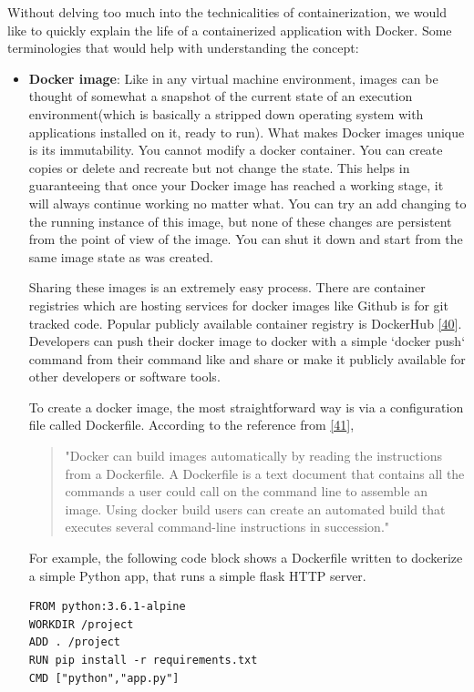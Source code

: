 \documentclass[12pt,titlepage]{article}
\begin{document}
Without delving too much into the technicalities of containerization, we would
like to quickly explain the life of a containerized application with Docker.
Some terminologies that would help with understanding the concept:
\begin{itemize}
\item \textbf{Docker image}: Like in any virtual machine environment, images can be thought of somewhat a
snapshot of the current state of an execution environment(which is basically a
stripped down operating system with applications installed on it, ready to run).
What makes Docker images unique is its immutability. You cannot modify a docker
container. You can create copies or delete and recreate but not change the
state. This helps in guaranteeing that once your Docker image has reached a
working stage, it will always continue working no matter what. You can try an
add changing to the running instance of this image, but none of these changes
are persistent from the point of view of the image. You can shut it down and
start from the same image state as was created.

Sharing these images is an extremely easy process. There are container
registries which are hosting services for docker images like Github is for git
tracked code. Popular publicly available container registry is DockerHub \hyperref[ref:40]{[40}].
Developers can push their docker image to docker with a simple
`docker push` command from their command like and share or make it publicly
available for other developers or software tools.

To create a docker image, the most straightforward way is via a configuration
file called Dockerfile. According to the reference from \hyperref[ref:41]{[41}],

\begin{quote}


"Docker can build images automatically by reading the instructions from a
Dockerfile. A Dockerfile is a text document that contains all the commands a
user could call on the command line to assemble an image. Using docker build
users can create an automated build that executes several command-line
instructions in succession."
\end{quote}

For example, the following code block shows a Dockerfile written to dockerize a
simple Python app, that runs a simple flask HTTP server.

\begin{lstlisting}
FROM python:3.6.1-alpine
WORKDIR /project
ADD . /project
RUN pip install -r requirements.txt
CMD ["python","app.py"]
\end{lstlisting}


\end{itemize}
\end{document}
